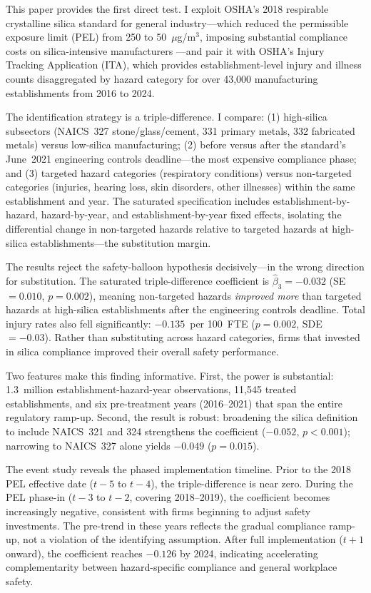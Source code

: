 \documentclass[12pt]{article}
\begin{document}
This paper provides the first direct test. I exploit OSHA's 2018 respirable crystalline silica standard for general industry---which reduced the permissible exposure limit (PEL) from 250 to 50~$\mu$g/m$^3$, imposing substantial compliance costs on silica-intensive manufacturers \citep{osha2016silica}---and pair it with OSHA's Injury Tracking Application (ITA), which provides establishment-level injury and illness counts disaggregated by hazard category for over 43,000 manufacturing establishments from 2016 to 2024.

The identification strategy is a triple-difference. I compare: (1) high-silica subsectors (NAICS~327 stone/glass/cement, 331 primary metals, 332 fabricated metals) versus low-silica manufacturing; (2) before versus after the standard's June~2021 engineering controls deadline---the most expensive compliance phase; and (3) targeted hazard categories (respiratory conditions) versus non-targeted categories (injuries, hearing loss, skin disorders, other illnesses) within the same establishment and year. The saturated specification includes establishment-by-hazard, hazard-by-year, and establishment-by-year fixed effects, isolating the differential change in non-targeted hazards relative to targeted hazards at high-silica establishments---the substitution margin.

The results reject the safety-balloon hypothesis decisively---in the wrong direction for substitution. The saturated triple-difference coefficient is $\hat{\beta}_3 = -0.032$ (SE~$= 0.010$, $p = 0.002$), meaning non-targeted hazards \textit{improved more} than targeted hazards at high-silica establishments after the engineering controls deadline. Total injury rates also fell significantly: $-0.135$~per 100~FTE ($p = 0.002$, SDE~$= -0.03$). Rather than substituting across hazard categories, firms that invested in silica compliance improved their overall safety performance.

Two features make this finding informative. First, the power is substantial: 1.3~million establishment-hazard-year observations, 11,545 treated establishments, and six pre-treatment years (2016--2021) that span the entire regulatory ramp-up. Second, the result is robust: broadening the silica definition to include NAICS~321 and 324 strengthens the coefficient ($-0.052$, $p < 0.001$); narrowing to NAICS~327 alone yields $-0.049$ ($p = 0.015$).

The event study reveals the phased implementation timeline. Prior to the 2018 PEL effective date ($t - 5$ to $t - 4$), the triple-difference is near zero. During the PEL phase-in ($t - 3$ to $t - 2$, covering 2018--2019), the coefficient becomes increasingly negative, consistent with firms beginning to adjust safety investments. The pre-trend in these years reflects the gradual compliance ramp-up, not a violation of the identifying assumption. After full implementation ($t + 1$ onward), the coefficient reaches $-0.126$ by 2024, indicating accelerating complementarity between hazard-specific compliance and general workplace safety.
\end{document}
